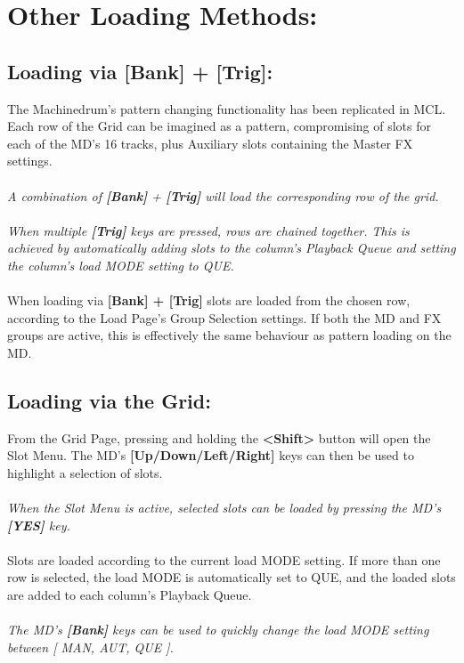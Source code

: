 \chapter{Other Loading Methods:}
\section{Loading via [Bank] + [Trig]:}
The Machinedrum's pattern changing functionality has been replicated in MCL. Each row of the Grid can be imagined as a pattern, compromising of slots for each of the MD's 16 tracks, plus Auxiliary slots containing the Master FX settings.\\
\\
\textit{A combination of \textbf{[Bank]} + \textbf{[Trig]} will load the corresponding row of the grid.\\\\
When multiple \textbf{[Trig]} keys are pressed, rows are chained together. This is achieved by automatically adding slots to the column's Playback Queue and setting the column's load MODE setting to QUE.}
\\\\
When loading via \textbf{[Bank] + [Trig]} slots are loaded from the chosen row, according to the Load Page's Group Selection settings. If both the MD and FX groups are active, this is effectively the same behaviour as pattern loading on the MD.

\section{Loading via the Grid:}
From the Grid Page, pressing and holding the \textbf{<Shift>} button will open the Slot Menu. The MD's \textbf{[Up/Down/Left/Right]} keys can then be used to highlight a selection of slots.\\\\
\textit{When the Slot Menu is active, selected slots can be loaded by pressing the MD's \textbf{[YES]} key.}
\\\\Slots are loaded according to the current load MODE setting. If more than one row is selected, the load MODE is automatically set to QUE, and the loaded slots are added to each column's Playback Queue.
\\\\
\textit{The MD's \textbf{[Bank]} keys can be used to quickly change the load MODE setting between [ MAN, AUT, QUE ].}